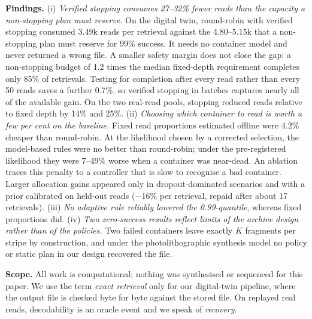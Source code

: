 \documentclass[conference,onecolumn,11pt]{IEEEtran}
\begin{document}
\textbf{Findings.}  (i) \emph{Verified stopping consumes 27--32\% fewer reads than the capacity a
non-stopping plan must reserve.}  On the digital twin, round-robin with verified stopping consumed 3.49k
reads per retrieval against the 4.80--5.15k that a non-stopping plan must reserve for 99\% success.  It
needs no container model and never returned a wrong file.  A smaller safety margin does not close the
gap: a non-stopping budget of 1.2 times the median fixed-depth requirement completes only 85\%
of retrievals.  Testing for completion after every read rather than every 50 reads saves a further
0.7\%, so verified stopping in batches captures nearly all of the available gain.  On the two
real-read pools, stopping reduced reads relative to fixed depth by 14\% and 25\%.
(ii) \emph{Choosing which container to read is worth a few per cent on the baseline.}  Fixed read
proportions estimated offline were 4.2\% cheaper than round-robin.  At the likelihood chosen by a
corrected selection, the model-based rules were no better than round-robin; under the pre-registered
likelihood they were 7--49\% worse when a container was near-dead.  An ablation traces this penalty to a
controller that is slow to recognise a bad container.  Larger allocation gains appeared only in
dropout-dominated scenarios and with a prior calibrated on held-out reads ($-$16\% per retrieval, repaid
after about 17 retrievals).
(iii) \emph{No adaptive rule reliably lowered the 0.99-quantile}, whereas fixed proportions did.
(iv) \emph{Two zero-success results reflect limits of the archive design rather than of the policies.}
Two failed containers leave exactly $K$ fragments per stripe by construction, and under the
photolithographic synthesis model no policy or static plan in our design recovered the file.

\textbf{Scope.}  All work is computational; nothing was synthesised or sequenced for this paper.  We use
the term \emph{exact retrieval} only for our digital-twin pipeline, where the output file is checked
byte for byte against the stored file.  On replayed real reads, decodability is an oracle event and we
speak of \emph{recovery}.
\end{document}
